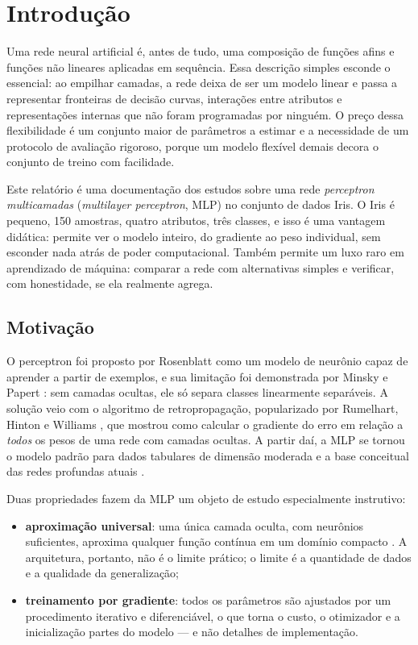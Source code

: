 \section{Introdução}
\label{sec:intro}

Uma rede neural artificial é, antes de tudo, uma composição de funções afins e funções não lineares
aplicadas em sequência. Essa descrição simples esconde o essencial: ao empilhar camadas, a rede
deixa de ser um modelo linear e passa a representar fronteiras de decisão curvas, interações entre
atributos e representações internas que não foram programadas por ninguém. O preço dessa
flexibilidade é um conjunto maior de parâmetros a estimar e a necessidade de um protocolo de
avaliação rigoroso, porque um modelo flexível demais decora o conjunto de treino com facilidade.

Este relatório é uma documentação dos estudos sobre uma rede \emph{perceptron multicamadas} (\emph{multilayer perceptron}, MLP) no
conjunto de dados Iris. O Iris é pequeno, 150 amostras, quatro atributos, três classes, e isso é uma vantagem didática: permite ver o modelo inteiro, do gradiente ao peso individual, sem esconder
nada atrás de poder computacional. Também permite um luxo raro em aprendizado de máquina:
comparar a rede com alternativas simples e verificar, com honestidade, se ela realmente agrega.

\subsection{Motivação}

O perceptron foi proposto por Rosenblatt \cite{rosenblatt1958} como um modelo de neurônio capaz de
aprender a partir de exemplos, e sua limitação foi demonstrada por Minsky e Papert
\cite{minsky1969}: sem camadas ocultas, ele só separa classes linearmente separáveis. A solução
veio com o algoritmo de retropropagação, popularizado por Rumelhart, Hinton e Williams
\cite{rumelhart1986}, que mostrou como calcular o gradiente do erro em relação a \emph{todos} os
pesos de uma rede com camadas ocultas. A partir daí, a MLP se tornou o modelo padrão para dados
tabulares de dimensão moderada e a base conceitual das redes profundas atuais
\cite{bishop2006,goodfellow2016}.

Duas propriedades fazem da MLP um objeto de estudo especialmente instrutivo:

\begin{itemize}
	\item \textbf{aproximação universal}: uma única camada oculta, com neurônios suficientes, aproxima
	      qualquer função contínua em um domínio compacto \cite{cybenko1989,hornik1989}. A arquitetura,
	      portanto, não é o limite prático; o limite é a quantidade de dados e a qualidade da
	      generalização;
	\item \textbf{treinamento por gradiente}: todos os parâmetros são ajustados por um procedimento
	      iterativo e diferenciável, o que torna o custo, o otimizador e a inicialização partes do
	      modelo --- e não detalhes de implementação.
\end{itemize}

